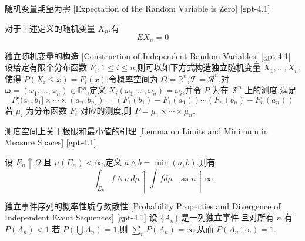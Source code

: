 \documentclass[UTF8]{ctexart}
\begin{document}
    
    
    \begin{ppt}
        {随机变量期望为零}
        [Expectation of the Random Variable is Zero]
        [gpt-4.1]
        
对于上述定义的随机变量 $X_n$,有
\[
E X_{n} = 0
\]

    \end{ppt}
    
    
    
    \begin{dfn}
        {独立随机变量的构造}
        [Construction of Independent Random Variables]
        [gpt-4.1]
        设给定有限个分布函数 $F_i, 1 \leq i \leq n$,则可以如下方式构造独立随机变量 $X_1, \ldots, X_n$,使得 $P(X_i \leq x) = F_i(x)$:令概率空间为 $\Omega = \mathbb{R}^n$,$\mathcal{F} = \mathcal{R}^n$,对 $\boldsymbol{\omega} = (\omega_1, \ldots, \omega_n) \in \mathbb{R}^n$,定义 $X_i(\omega_1, \ldots, \omega_n) = \omega_i$,并令 $P$ 为在 $\mathcal{R}^n$ 上的测度,满足
\[
P((a_1, b_1] \times \cdots \times (a_n, b_n]) = (F_1(b_1) - F_1(a_1)) \cdots (F_n(b_n) - F_n(a_n))
\]
若 $\mu_i$ 为分布函数 $F_i$ 对应的测度,则 $P = \mu_1 \times \cdots \times \mu_n$.

    \end{dfn}
    
    
    
    \begin{lma}
        {测度空间上关于极限和最小值的引理}
        [Lemma on Limits and Minimum in Measure Spaces]
        [gpt-4.1]
        
设 $E_{n} \uparrow \Omega$ 且 $\mu ( E_{n} ) < \infty$,定义 $a \wedge b = \min(a, b)$.则有
\[
\int_{E_{n}} f \wedge n \, d\mu \uparrow \int f d \mu \quad \text{as } n \uparrow \infty
\]

    \end{lma}
    
    
    
    \begin{thm}
        {独立事件序列的概率性质与敛散性}
        [Probability Properties and Divergence of Independent Event Sequences]
        [gpt-4.1]
        设 $\{A_n\}$ 是一列独立事件,且对所有 $n$ 有 $P(A_n) < 1$.若 $P\left(\bigcup A_n\right) = 1$,则 $\sum_n P(A_n) = \infty$,从而 $P(A_n \ \text{i.o.}) = 1$.
    \end{thm}
    
\end{document}
